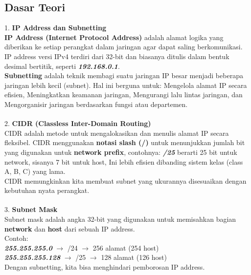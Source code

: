 \subsection{Dasar Teori}
1. \textbf{IP Address dan Subnetting}\\
\textbf{IP Address (Internet Protocol Address)} adalah alamat logika yang diberikan ke setiap perangkat dalam jaringan agar dapat saling berkomunikasi. IP address versi IPv4 terdiri dari 32-bit dan biasanya ditulis dalam bentuk desimal bertitik, seperti \textit{\textbf{192.168.0.1}}.\\
\textbf{Subnetting} adalah teknik membagi suatu jaringan IP besar menjadi beberapa jaringan lebih kecil (subnet). Hal ini berguna untuk: Mengelola alamat IP secara efisien, Meningkatkan keamanan jaringan, Mengurangi lalu lintas jaringan, dan Mengorganisir jaringan berdasarkan fungsi atau departemen.\\\\

2. \textbf{CIDR (Classless Inter-Domain Routing)}\\
CIDR adalah metode untuk mengalokasikan dan menulis alamat IP secara fleksibel. CIDR menggunakan \textbf{notasi slash (/)} untuk menunjukkan jumlah bit yang digunakan untuk \textbf{network prefix}, contohnya: \textit{\textbf{/25}} berarti 25 bit untuk network, sisanya 7 bit untuk host, Ini lebih efisien dibanding sistem kelas (class A, B, C) yang lama.\\
CIDR memungkinkan kita membuat subnet yang ukurannya disesuaikan dengan kebutuhan nyata perangkat.\\\\

3. \textbf{Subnet Mask}\\
Subnet mask adalah angka 32-bit yang digunakan untuk memisahkan bagian \textbf{network} dan \textbf{host} dari sebuah IP address.\\
Contoh:\\
\textbf{\textit{255.255.255.0}} $\to$ /24 $\to$ 256 alamat (254 host)\\
\textbf{\textit{255.255.255.128}} $\to$ /25 $\to$ 128 alamat (126 host)\\
Dengan subnetting, kita bisa menghindari pemborosan IP address.\\\\

